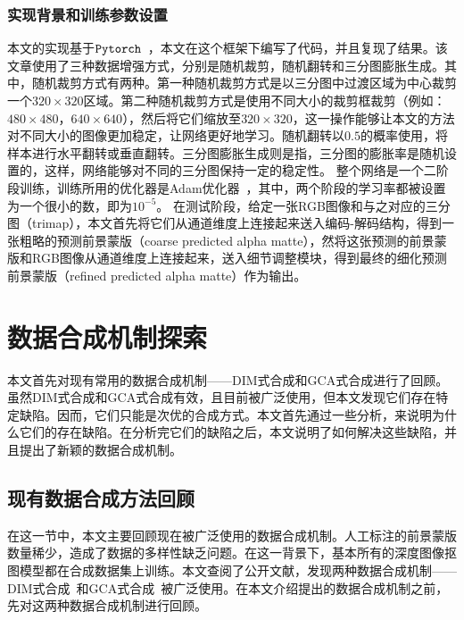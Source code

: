\documentclass[supercite]{HustGraduPaper}
\begin{document}
    \subsubsection{实现背景和训练参数设置}
    本文的实现基于$\tt{Pytorch}$~\cite{paszke2019pytorch}，本文在这个框架下编写了代码，并且复现了结果。该文章使用了三种数据增强方式，分别是随机裁剪，随机翻转和三分图膨胀生成。其中，随机裁剪方式有两种。第一种随机裁剪方式是以三分图中过渡区域为中心裁剪一个$320 \times 320$区域。第二种随机裁剪方式是使用不同大小的裁剪框裁剪（例如：$480 \times 480$，$640 \times 640$），然后将它们缩放至$320 \times 320$，这一操作能够让本文的方法对不同大小的图像更加稳定，让网络更好地学习。随机翻转以$0.5$的概率使用，将样本进行水平翻转或垂直翻转。三分图膨胀生成则是指，三分图的膨胀率是随机设置的，这样，网络能够对不同的三分图保持一定的稳定性。
    整个网络是一个二阶段训练，训练所用的优化器是Adam优化器~\cite{adam}，其中，两个阶段的学习率都被设置为一个很小的数，即为$10^{-5}$。
    在测试阶段，给定一张RGB图像和与之对应的三分图（trimap），本文首先将它们从通道维度上连接起来送入编码-解码结构，得到一张粗略的预测前景蒙版（coarse predicted alpha matte），然将这张预测的前景蒙版和RGB图像从通道维度上连接起来，送入细节调整模块，得到最终的细化预测前景蒙版（refined predicted alpha matte）作为输出。

    
    
	
	\section{数据合成机制探索}
	\label{sec:proposed}
	本文首先对现有常用的数据合成机制——DIM式合成和GCA式合成进行了回顾。虽然DIM式合成和GCA式合成有效，且目前被广泛使用，但本文发现它们存在特定缺陷。因而，它们只能是次优的合成方式。本文首先通过一些分析，来说明为什么它们的存在缺陷。在分析完它们的缺陷之后，本文说明了如何解决这些缺陷，并且提出了新颖的数据合成机制。

	\subsection{现有数据合成方法回顾}
    在这一节中，本文主要回顾现在被广泛使用的数据合成机制。人工标注的前景蒙版数量稀少，造成了数据的多样性缺乏问题。在这一背景下，基本所有的深度图像抠图模型都在合成数据集上训练。本文查阅了公开文献，发现两种数据合成机制——DIM式合成~\cite{DIM}和GCA式合成~\cite{GCA}被广泛使用。在本文介绍提出的数据合成机制之前，先对这两种数据合成机制进行回顾。
    
\end{document}

